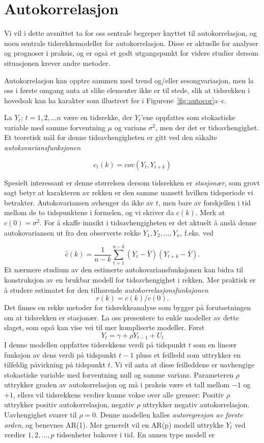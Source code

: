 \section{Autokorrelasjon}
Vi vil i dette avsnittet ta for oss sentrale begreper knyttet til 
autokorrelasjon, og noen sentrale tidsrekkemodeller for autokorrelasjon.
Disse er aktuelle  for analyser og prognoser i praksis, og er
også et godt utgangspunkt for videre studier dersom situasjonen krever
andre metoder.


Autokorrelasjon kan opptre sammen med trend og/eller sesongvariasjon, men la
oss i første omgang anta at slike elementer ikke er til stede, slik at
tidsrekken i hovedsak kan ha karakter som illustrert før i Figurene~\ref{fig:autocor}a--c.

La $Y_t$; $t=1,2,\ldots n$ være en tidsrekke, der $Y_t$'ene
oppfattes som sto\-kas\-tiske variable med samme forventning $\mu $ og varians
${\sigma}^2$, men der det er tidsavhengighet.  Et teoretisk mål for denne
tidsavhengigheten er gitt ved den såkalte {\em autokovariansfunksjonen}

\[  c_t(k)=cov(Y_t,Y_{t+k})      \]

\noindent Spesielt interessant er denne størrelsen dersom tidsrekken er
{\em stasjonær}, som grovt sagt betyr at karakteren av rekken er den samme
uansett hvilken tidsperiode vi betrakter.  Autokovariansen avhenger da ikke 
av $t$, men bare av forskjellen i tid mellom de to tidspunktene i formelen,
og vi skriver da $c(k)$. Merk at $c(0) = {\sigma}^2$.  For å skaffe 
innsikt i tidsavhengigheten er det aktuelt å anslå denne 
autokovariansen ut fra den observerte rekke $Y_1, Y_2, \ldots, Y_n$, f.eks.
ved 

\[ \hat{c}(k)=\frac{1}{n-k} \sum_{t=1}^{n-k} (Y_t-\bar{Y})(Y_{t+k}-\bar{Y}) . \]
Et nærmere studium av den estimerte autokovariansfunksjonen kan
bidra til konstruksjon av en brukbar modell for tidsavhengighet i rekken.
Mer praktisk er å studere estimatet for den tilhørende
 {\em autokorrelasjonsfunksjonen}
          \[ r(k)=c(k)/c(0).  \]
Det finnes en rekke metoder for tidsrekkeanalyse som bygger på
forutsetningen om at tidsrekken er stasjonær. La oss presentere to
enkle  modeller av dette slaget, som også kan vise vei til mer kompliserte
modeller. Først
\[ Y_t= \gamma +\rho Y_{t-1} + U_t       \]
I denne modellen oppfattes tidsrekkens verdi på tidspunkt $t$
som en lineær funksjon av dens verdi på tidspunkt $t - 1$ pluss et
feilledd som uttrykker en tilfeldig påvirkning på tidspunkt $t$. Vi
vil anta at disse feilleddene er uavhengige stokastiske variable med
forventning null og samme varians.  Parameteren $\rho$  uttrykker graden av
autokorrelasjon og må i praksis være et tall mellom $-1$ og $+1$,
ellers vil tidsrekkens verdier kunne vokse over alle grenser:  Positiv $\rho$
uttrykker positiv autokorrelasjon, negativ $\rho$ uttrykker negativ
autokorrelasjon. Uavhengighet svarer til $\rho =0$.
Denne modellen kalles {\em autoregresjon av første orden}, og benevnes
AR(1). Mer generelt vil en AR(p) modell  uttrykke $Y_t$ ved verdier
$1,2,\ldots ,p$ tidsenheter bakover i tid. En annen type modell er

